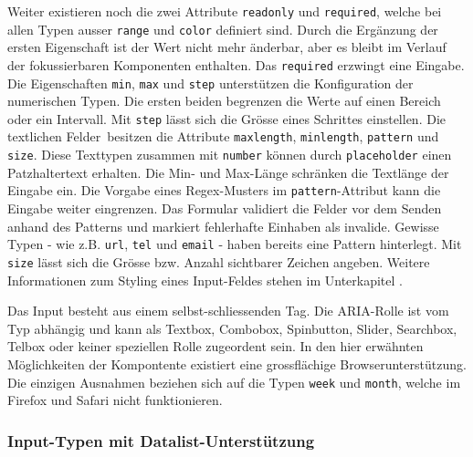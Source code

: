 Weiter existieren noch die zwei Attribute \texttt{readonly} und \texttt{required}, welche bei allen Typen ausser \texttt{range} und \texttt{color} definiert sind.
Durch die Ergänzung der ersten Eigenschaft ist der Wert nicht mehr änderbar, aber es bleibt im Verlauf der fokussierbaren Komponenten enthalten.
Das \texttt{required} erzwingt eine Eingabe.
Die Eigenschaften \texttt{min}, \texttt{max} und \texttt{step} unterstützen die Konfiguration der numerischen Typen\footnotemark.
Die ersten beiden begrenzen die Werte auf einen Bereich oder ein Intervall.
Mit \texttt{step} lässt sich die Grösse eines Schrittes einstellen.
Die textlichen Felder\footnotemark \ besitzen die Attribute \texttt{maxlength}, \texttt{minlength}, \texttt{pattern} und \texttt{size}.
Diese Texttypen zusammen mit \texttt{number} können durch \texttt{placeholder} einen Patzhaltertext erhalten.
Die Min- und Max-Länge schränken die Textlänge der Eingabe ein.
Die Vorgabe eines Regex-Musters im \texttt{pattern}-Attribut kann die Eingabe weiter eingrenzen.
Das Formular validiert die Felder vor dem Senden anhand des Patterns und markiert fehlerhafte Einhaben als invalide.
Gewisse Typen - wie z.B. \texttt{url}, \texttt{tel} und \texttt{email} - haben bereits eine Pattern hinterlegt.
Mit \texttt{size} lässt sich die Grösse bzw. Anzahl sichtbarer Zeichen angeben.
Weitere Informationen zum Styling eines Input-Feldes stehen im Unterkapitel \textbf{}.

Das Input besteht aus einem selbst-schliessenden Tag.
Die ARIA-Rolle ist vom Typ abhängig und kann als Textbox, Combobox, Spinbutton, Slider, Searchbox, Telbox oder keiner speziellen Rolle zugeordent sein.
In den hier erwähnten Möglichkeiten der Kompontente existiert eine grossflächige Browserunterstützung.
Die einzigen Ausnahmen beziehen sich auf die Typen \texttt{week} und \texttt{month}, welche im Firefox und Safari nicht funktionieren.


\subsubsection{{\color{dgray} Input-Typen mit Datalist-Unterstützung}}
\label{sec:inputTypesDatalist}

